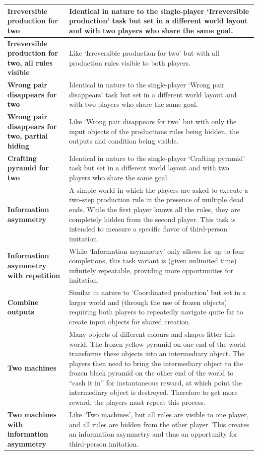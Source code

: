 \documentclass[11pt, a4paper, logo, copyright]{deepmind}
\begin{document}
\begin{appendix}
\begin{longtable}{|>{\raggedright}p{4cm}|p{12cm}|}
\textbf{Irreversible production for two} & Identical in nature to the single-player `Irreversible production' task but set in a different world layout and with two players who share the same goal. \\ \hline
\textbf{Irreversible production for two, all rules visible} & Like `Irreversible production for two' but with all production rules visible to both players. \\ \hline
\textbf{Wrong pair disappears for two} & Identical in nature to the single-player `Wrong pair disappears' task but set in a different world layout and with two players who share the same goal. \\ \hline
\textbf{Wrong pair disappears for two, partial hiding} & Like `Wrong pair disappears for two' but with only the input objects of the productions rules being hidden, the outputs and condition being visible. \\ \hline
\textbf{Crafting pyramid for two} & Identical in nature to the single-player `Crafting pyramid' task but set in a different world layout and with two players who share the same goal. \\ \hline
\textbf{Information asymmetry} & A simple world in which the players are asked to execute a two-step production rule in the presence of multiple dead ends. While the first player knows all the rules, they are completely hidden from the second player. This task is intended to measure a specific flavor of third-person imitation. \\ \hline
\textbf{Information asymmetry with repetition} & While `Information asymmetry' only allows for up to four completions, this task variant is (given unlimited time) infinitely repeatable, providing more opportunities for imitation. \\ \hline
\textbf{Combine outputs} & Similar in nature to `Coordinated production' but set in a larger world and (through the use of frozen objects) requiring both players to repeatedly navigate quite far to create input objects for shared creation. \\ \hline
\textbf{Two machines} & Many objects of different colours and shapes litter this world. The frozen yellow pyramid on one end of the world transforms these objects into an intermediary object. The players then need to bring the intermediary object to the frozen black pyramid on the other end of the world to ``cash it in'' for instantaneous reward, at which point the intermediary object is destroyed. Therefore to get more reward, the players must repeat this process. \\ \hline
\textbf{Two machines with information asymmetry} & Like `Two machines', but all rules are visible to one player, and all rules are hidden from the other player. This creates an information asymmetry and thus an opportunity for third-person imitation. \\ \hline
\end{longtable}

\end{appendix}
\end{document}
